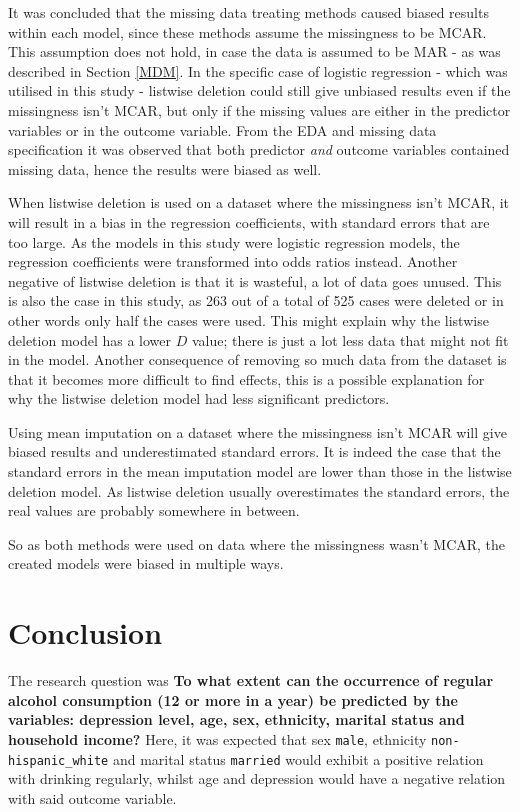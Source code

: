 \documentclass[
]{article}
\begin{document}
It was concluded that the missing data treating methods caused biased results within each model, since these methods assume the missingness to be MCAR. This assumption does not hold, in case the data is assumed to be MAR - as was described in Section \ref{MDM}. In the specific case of logistic regression - which was utilised in this study - listwise deletion could still give unbiased results even if the missingness isn't MCAR, but only if the missing values are either in the predictor variables or in the outcome variable. From the EDA and missing data specification it was observed that both predictor \emph{and} outcome variables contained missing data, hence the results were biased as well.

When listwise deletion is used on a dataset where the missingness isn't MCAR, it will result in a bias in the regression coefficients, with standard errors that are too large. As the models in this study were logistic regression models, the regression coefficients were transformed into odds ratios instead. Another negative of listwise deletion is that it is wasteful, a lot of data goes unused. This is also the case in this study, as 263 out of a total of 525 cases were deleted or in other words only half the cases were used. This might explain why the listwise deletion model has a lower \(D\) value; there is just a lot less data that might not fit in the model. Another consequence of removing so much data from the dataset is that it becomes more difficult to find effects, this is a possible explanation for why the listwise deletion model had less significant predictors.

Using mean imputation on a dataset where the missingness isn't MCAR will give biased results and underestimated standard errors. It is indeed the case that the standard errors in the mean imputation model are lower than those in the listwise deletion model. As listwise deletion usually overestimates the standard errors, the real values are probably somewhere in between.

So as both methods were used on data where the missingness wasn't MCAR, the created models were biased in multiple ways.

\hypertarget{conclusion}{%
\section{Conclusion}\label{conclusion}}

The research question was \textbf{To what extent can the occurrence of regular alcohol consumption (12 or more in a year) be predicted by the variables: depression level, age, sex, ethnicity, marital status and household income?} Here, it was expected that sex \texttt{male}, ethnicity \texttt{non-hispanic\_white} and marital status \texttt{married} would exhibit a positive relation with drinking regularly, whilst age and depression would have a negative relation with said outcome variable.
\end{document}
